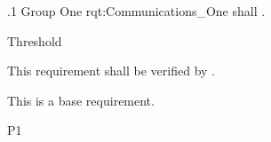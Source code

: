 \ONERQMTV
{\RqtNumberBase.1}
{Group One}
{rqt:Communications_One}
{\ThisSys shall \TBD.}
{
	\item [Phase 1] Threshold
}
{This requirement shall be verified by \TBD.}
{
\item [N/A] This is a base requirement.
}
{
	\item \TBD
}
{P1}

